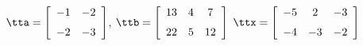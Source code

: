 {$\tta = \left[ \begin {array}{cc} -1&-2 \\ \noalign{\medskip} -2&-3 \end {array} \right] $, 
 \quad
$\ttb=\left[ \begin {array}{ccc} 13&4&7\\ \noalign{\medskip} 22&5&12  \end {array} \right] $}
{$\ttx=\left[ \begin {array}{ccc} -5&2&-3\\ \noalign{\medskip} -4&-3&-2  \end {array} \right] $}
